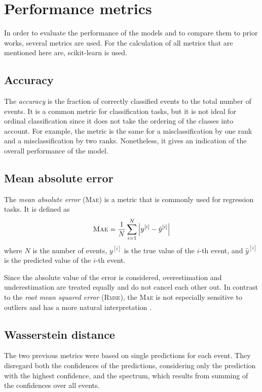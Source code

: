 \section{Performance metrics}
In order to evaluate the performance of the models
and to compare them to prior works,
several metrics are used.
%
For the calculation of all metrics that are mentioned here are,
scikit-learn \cite{sklearn} is used.


\subsection{Accuracy} \label{sec:unfolding:metrics:accuracy}
The \emph{accuracy} \cite{accuracy} is the fraction of correctly classified events to the total number of events.
It is a common metric for classification tasks,
but it is not ideal for ordinal classification
  since it does not take the ordering of the classes into account.
For example,
the metric is the same for
a misclassification by one rank
and a misclassification by two ranks.
%
Nonetheless,
it gives an indication of the overall performance of the model.


\subsection{Mean absolute error} \label{sec:unfolding:metrics:mae}
The \emph{mean absolute error} (\textsc{Mae}) \cite{mae} is a metric that is commonly used for regression tasks. %
It is defined as
\begin{equation}
  \text{\textsc{Mae}} = \frac{1}{N} \sum_{i=1}^N \left| y^{[i]} - \hat{y}^{[i]} \right|
\end{equation}
where $N$ is the number of events,
$y^{[i]}$ is the true value of the $i$-th event,
and $\hat{y}^{[i]}$ is the predicted value of the $i$-th event. %


Since the absolute value of the error is considered,
overestimation and underestimation are treated equally
and do not cancel each other out.
In contrast to the \emph{root mean squared error} (\textsc{Rmse}),
the \textsc{Mae} is not especially sensitive to outliers
and has a more natural interpretation \cite{mae}.


\subsection{Wasserstein distance} \label{sec:unfolding:metrics:wd}
The two previous metrics were based on single predictions for each event.
They disregard both
  the confidences of the predictions,
    considering only the prediction with the highest confidence,
  and the spectrum,
    which results from summing of the confidences over all events.


